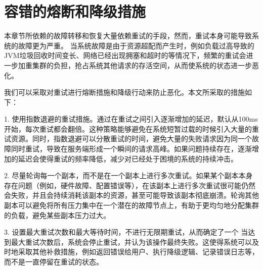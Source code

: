 \section{容错的熔断和降级措施}

本章节所依赖的故障转移和恢复大量依赖重试的手段，然而，重试本身可能导致系统的故障更为严重。
当系统故障是由于资源超配而产生时，例如负载过高导致的JVM垃圾回收时间变长、网络已经出现拥塞和超时的等情况下，频繁的重试会进一步加重集群的负担，抢占系统其他请求的存活空间，从而使系统的状态进一步恶化。

我们可以采取对重试进行熔断措施和降级行动来防止恶化。本文所采取的措施如下：

1. 使用指数退避的重试措施。通过在重试之间引入逐渐增加的延迟，默认从100ms开始，每次重试都会翻倍。这种策略能够避免在系统短暂过载的时候引入大量的重试资源。同时，指数退避可以分散重试的时间，避免大量的失败请求因为同一个故障同时重试，导致在服务端形成一个瞬间的请求高峰。如果问题持续存在，逐渐增加的延迟会使得重试的频率降低，减少对已经处于困境的系统的持续冲击。

2. 尽量轮询每一个副本，而不是在一个副本上进行多次重试。如果某个副本本身存在问题（例如，硬件故障、配置错误等），在该副本上进行多次重试很可能仍然会失败，并且会持续消耗该副本的资源，甚至可能导致该副本彻底崩溃。轮询其他副本可以避免将所有压力集中在一个潜在的故障节点上，有助于更均匀地分配集群的负载，避免某些副本压力过大。

3. 设置最大重试次数和最大等待时间，不进行无限期重试，从而确定了一个
当达到最大重试次数后，系统会停止重试，并认为该操作最终失败。这使得系统可以及时地采取其他补救措施，例如返回错误给用户、执行降级逻辑、记录错误日志等，而不是一直停留在重试的状态。


